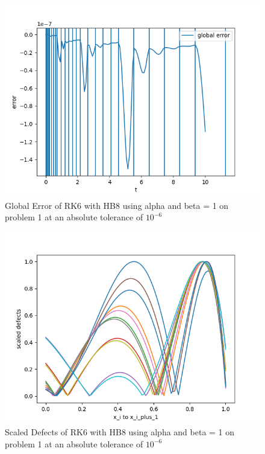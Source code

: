 \documentclass{article}
\begin{document}
\begin{figure}[H]
\centering
\includegraphics[width=0.7\linewidth]{./figures/static_alpha_rk6_with_hb8_p1_global_error}
\caption{Global Error of RK6 with HB8 using alpha and beta = 1 on problem 1 at an absolute tolerance of $10^{-6}$}
\label{fig:static_alpha_rk6_with_hb8_p1_global_error}
\end{figure}

\begin{figure}[H]
\centering
\includegraphics[width=0.7\linewidth]{./figures/static_alpha_rk6_with_hb8_p1_scaled_defects}
\caption{Scaled Defects of RK6 with HB8 using alpha and beta = 1 on problem 1 at an absolute tolerance of $10^{-6}$}
\label{fig:static_alpha_rk6_with_hb8_p1_scaled_defects}
\end{figure}
\end{document}
